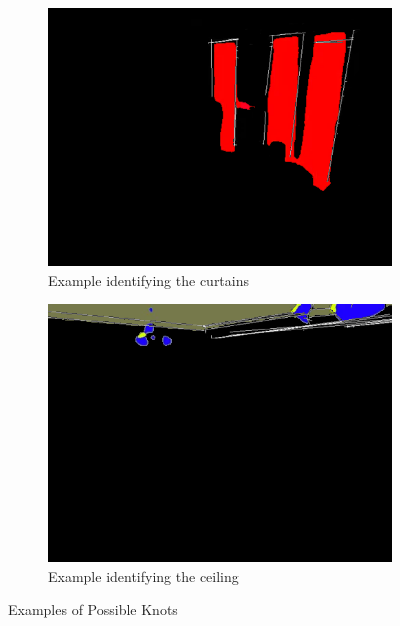 \begin{figure}[htbp]
    \centering
    \begin{subfigure}[b]{0.38\textwidth}
        \centering
        \includegraphics[width=\textwidth]{images/knot1.png}
        \caption{Example identifying the curtains}
        \label{fig:knots_example_1}
    \end{subfigure}
    \hfill
    \begin{subfigure}[b]{0.38\textwidth}
        \centering
        \includegraphics[width=\textwidth]{images/knot2.png}
        \caption{Example identifying the ceiling}
        \label{fig:knots_example_2}
    \end{subfigure}
    \caption{Examples of Possible Knots}
    \label{fig:knots_examples}
\end{figure}

